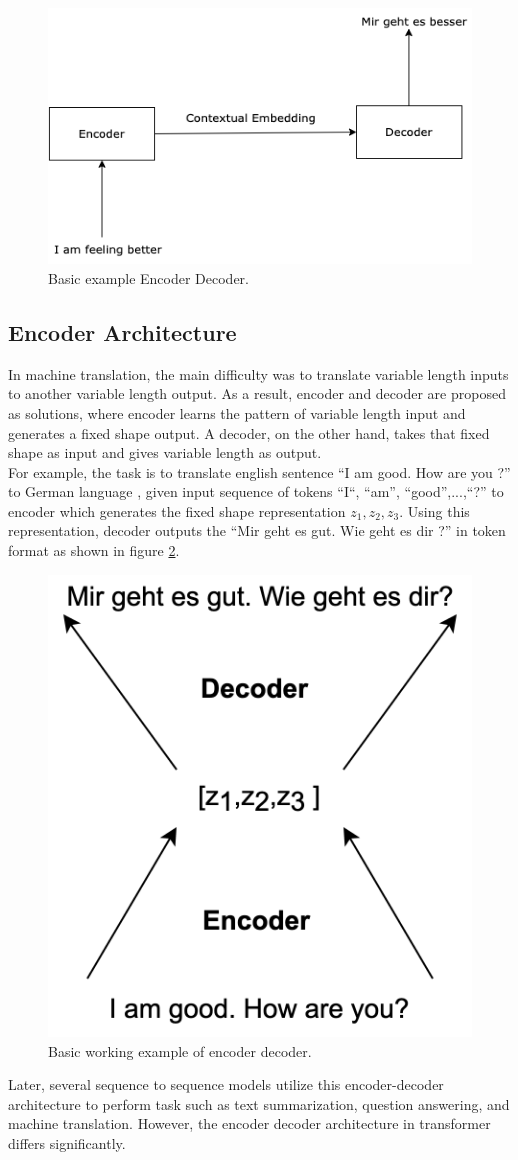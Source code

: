 \documentclass[%
	BCOR=8mm, %
	DIV=12,
	toc=bibliography, %
	toc=listof, %
	oneside, %
	egregdoesnotlikesansseriftitles, %
	]{scrbook}
\begin{document}
\begin{figure}[h!]
\centering
\includegraphics[width=.50\textwidth]{img/encoderDecoder.png}
\caption[Basic example of encoder and decoder]{Basic example Encoder Decoder.}
\label{diag:EncoderDecoder}
\end{figure}

\subsection{Encoder Architecture}
In machine translation, the main difficulty was to translate variable length inputs to another variable length output. As a result, encoder and decoder are proposed as solutions, where encoder learns the pattern of variable length input and generates a fixed shape output. A decoder, on the other hand, takes that fixed shape as input and gives variable length as output. \\
For example, the task is to translate english sentence ``I am good. How are you ?'' to German language , given input sequence of tokens ``I``, ``am'', ``good'',...,``?'' to encoder which generates the fixed shape representation $z_{1},z_{2},z_{3}$. Using this representation, decoder outputs the ``Mir geht es gut. Wie geht es dir ?'' in token format as shown in figure \ref{diag:EncoderDecoderExp}.\\
\begin{figure}[H]
    \centering
    \includegraphics[width=.30\textwidth]{img/EncoderDecoder2.png}
    \caption[Basic example of encoder and decoder working]{Basic working example of encoder decoder.}
    \label{diag:EncoderDecoderExp}
\end{figure}
 Later, several sequence to sequence models utilize this encoder-decoder architecture to perform task such as text summarization, question answering, and machine translation. However, the encoder decoder architecture in transformer differs significantly.\\
\end{document}
